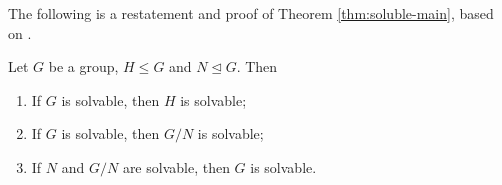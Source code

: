 
The following is a restatement and proof of Theorem \ref{thm:soluble-main}, based on \cite[Chapter~14]{Stewart}.

\begin{theorem} \label{thm:soluble-main-appendix}
	Let $G$ be a group, $H \le G$ and $N \trianglelefteq G$. Then 
	\begin{enumerate}[label=(\roman*)]
		\item If $G$ is solvable, then $H$ is solvable;
		\item If $G$ is solvable, then $G / N$ is solvable; 
		\item If $N$ and $G / N$ are solvable, then $G$ is solvable. 
	\end{enumerate}
\end{theorem}
